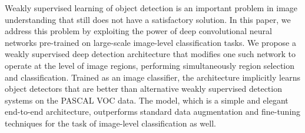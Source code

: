 Weakly supervised learning of object detection is an important problem in image understanding that still does not have a satisfactory solution.  In this paper, we address this problem by exploiting the power of deep convolutional neural networks pre-trained on large-scale image-level classification tasks. We propose a weakly supervised deep detection architecture that modifies one such network to operate at the level of image regions, performing simultaneously region selection and classification. Trained as an image classifier, the architecture implicitly learns object detectors that are better than alternative weakly supervised detection systems on the PASCAL VOC data. The model, which is a simple and elegant end-to-end architecture, outperforms standard data augmentation and fine-tuning techniques for the task of image-level classification as well.
